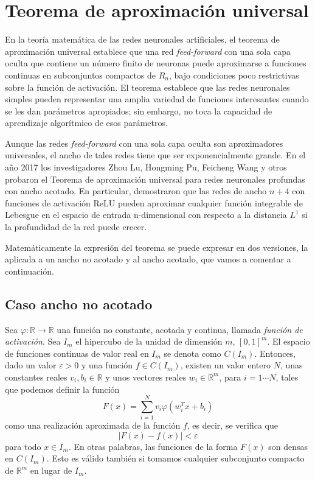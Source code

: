 \documentclass[
  a4paper,
  12pt,
  spanish,
]{scrartcl}
\theoremstyle{teorema-style}
\begin{document}
\begin{itemize}
\end{itemize}

\section{Teorema de aproximación universal}

En la teoría matemática de las redes neuronales artificiales, el teorema de aproximación universal establece que una red \textit{feed-forward} con una sola capa oculta que contiene un número finito de neuronas puede aproximarse a funciones continuas en subconjuntos compactos de $R_n$, bajo condiciones poco restrictivas sobre la función de activación. El teorema establece que las redes neuronales simples pueden representar una amplia variedad de funciones interesantes cuando se les dan parámetros apropiados; sin embargo, no toca la capacidad de aprendizaje algorítmico de esos parámetros.

Aunque las redes \textit{feed-forward} con una sola capa oculta son aproximadores universales, el ancho de tales redes tiene que ser exponencialmente grande. En el año 2017 los investigadores Zhou Lu, Hongming Pu, Feicheng Wang y otros \parencite{lu_expressive_2017} probaron el Teorema de aproximación universal para redes neuronales profundas con ancho acotado. En particular, demostraron que las redes de ancho $n + 4$ con funciones de activación ReLU pueden aproximar cualquier función integrable de Lebesgue en el espacio de entrada n-dimensional con respecto a la distancia $L ^ {1}$ si la profundidad de la red puede crecer.

Matemáticamente la expresión del teorema se puede expresar en dos versiones, la aplicada a un ancho no acotado y al ancho acotado, que vamos a comentar a continuación.

\subsection{Caso ancho no acotado}

Sea $\varphi:\mathbb{R} \rightarrow \mathbb{R}$ una función no constante, acotada y continua, llamada \textit{función de activación}.
Sea $I_m$ el hipercubo de la unidad de dimensión $m$, $[0,1]^m$.
El espacio de funciones continuas de valor real en $I_m$ se denota como $C(I_m)$.
Entonces, dado un valor $\varepsilon > 0$ y una función $f \in C(I_m)$, existen un valor entero $N$, unas constantes reales $v_i , b_i \in \mathbb{R}$ y unos vectores reales $w_i \in \mathbb{R}^m$, para $i =1 \cdots N$, tales que podemos definir la función
\[
  F (x) = \sum_{{i = 1}}^{{N}} v_{i} \varphi \left (w_ {i} ^ {T} x + b_ {i} \right)
\]
como una realización aproximada de la función $f$, es decir, se verifica que
\[
  |F(x)-f(x)| < \varepsilon
\]
para todo \(x \in I_m\).
En otras palabras, las funciones de la forma $F(x)$ son densas en $C(I_m)$.
Esto es válido también si tomamos cualquier subconjunto compacto de $\mathbb{R}^m$ en lugar de $I_m$.
\end{document}
